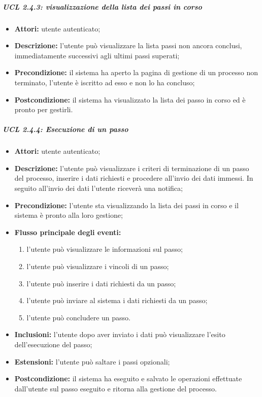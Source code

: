 \subparagraph{UCL 2.4.3: visualizzazione della lista dei passi in corso}
\begin{itemize}
\item \textbf{Attori:} utente autenticato;
\item \textbf{Descrizione:} l'utente può visualizzare la lista passi non ancora conclusi, immediatamente successivi agli ultimi passi superati;
\item \textbf{Precondizione:} il sistema ha aperto la pagina di gestione di un processo non terminato, l'utente è iscritto ad esso e non lo ha concluso;
\item \textbf{Postcondizione:} il sistema ha visualizzato la lista dei passo in corso ed è pronto per gestirli.
\end{itemize}

\subparagraph{UCL 2.4.4: Esecuzione di un passo}
\begin{itemize}
\item \textbf{Attori:} utente autenticato;
\item \textbf{Descrizione:} l'utente può visualizzare i criteri di terminazione di un passo del processo, inserire i dati richiesti e procedere all'invio dei dati immessi. In seguito all'invio dei dati l'utente riceverà una notifica;
\item \textbf{Precondizione:} l'utente sta visualizzando la lista dei passi in corso e il sistema è pronto alla loro gestione;
\item \textbf{Flusso principale degli eventi:}
\begin{enumerate}
\item l'utente può visualizzare le informazioni sul passo;
\item l'utente può visualizzare i vincoli di un passo;
\item l'utente può inserire i dati richiesti da un passo;
\item l'utente può inviare al sistema i dati richiesti da un passo;
\item l'utente può concludere un passo.
\end{enumerate}
\item \textbf{Inclusioni:} l'utente dopo aver inviato i dati può visualizzare l'esito dell'esecuzione del passo;
\item \textbf{Estensioni:} l'utente può saltare i passi opzionali;
\item \textbf{Postcondizione:} il sistema ha eseguito e salvato le operazioni effettuate dall'utente sul passo eseguito e ritorna alla gestione del processo.
\end{itemize}


